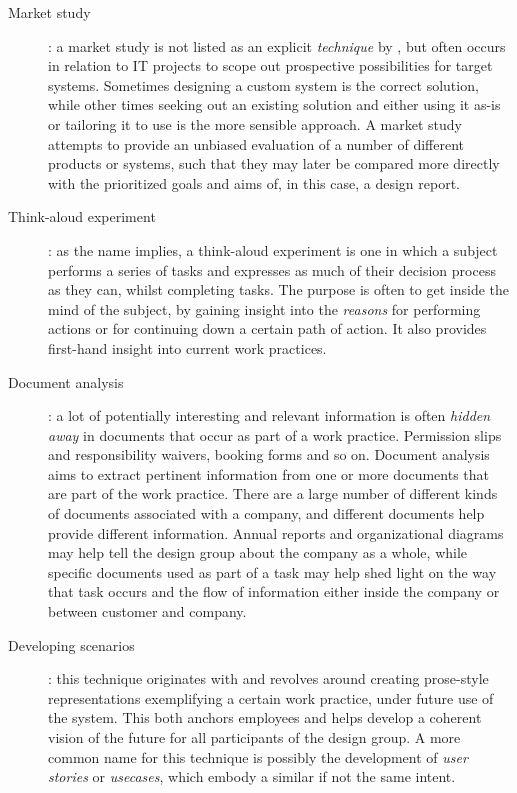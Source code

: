 \begin{description}
    \item [Market study]: a market study is not listed as an explicit \textit{technique} by \cite{bodker2004participatory}, but often
        occurs in relation to IT projects to scope out prospective possibilities for target systems. Sometimes designing a custom system
        is the correct solution, while other times seeking out an existing solution and either using it as-is or tailoring it to use is
        the more sensible approach. A market study attempts to provide an unbiased evaluation of a number of different products or systems,
        such that they may later be compared more directly with the prioritized goals and aims of, in this case, a design report.

    \item [Think-aloud experiment]: as the name implies, a think-aloud experiment is one in which a subject performs
        a series of tasks and expresses as much of their decision process as they can, whilst completing tasks. The
        purpose is often to get inside the mind of the subject, by gaining insight into the \textit{reasons} for performing
        actions or for continuing down a certain path of action. It also provides first-hand insight into current work practices.

    \item [Document analysis]: a lot of potentially interesting and relevant information is often \textit{hidden away} in documents
        that occur as part of a work practice. Permission slips and responsibility waivers, booking forms and so on. Document analysis
        aims to extract pertinent information from one or more documents that are part of the work practice. There are a large number of
        different kinds of documents associated with a company, and different documents help provide different information. Annual reports
        and organizational diagrams may help tell the design group about the company as a whole, while specific documents used as part of
        a task may help shed light on the way that task occurs and the flow of information either inside the company or between customer
        and company.

    \item [Developing scenarios]: this technique originates with \cite{clausen1993narratives} and revolves around creating
        prose-style representations exemplifying a certain work practice, under future use of the system. This both anchors employees
        and helps develop a coherent vision of the future for all participants of the design group. A more common name for this technique
        is possibly the development of \textit{user stories} or \textit{usecases}, which embody a similar if not the same intent.


\end{description}
